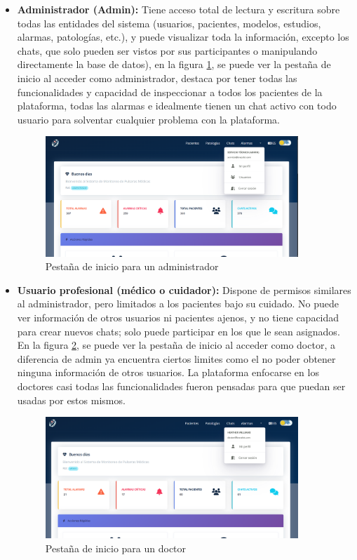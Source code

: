 \documentclass[12pt, a4paper]{article}
\begin{document}
\begin{itemize}
	\item \textbf{Administrador (Admin):}  
	Tiene acceso total de lectura y escritura sobre todas las entidades del sistema (usuarios, pacientes, modelos, estudios, alarmas, patologías, etc.), y puede visualizar toda la información, excepto los chats, que solo pueden ser vistos por sus participantes o manipulando directamente la base de datos), en la figura \ref{fig:admin}, se puede ver la pestaña de inicio al acceder como administrador, destaca por tener todas las funcionalidades y capacidad de inspeccionar a todos los pacientes de la plataforma, todas las alarmas e idealmente tienen un chat activo con todo usuario para solventar cualquier problema con la plataforma.
	
	
	\begin{figure}[htbp]
		\centering
		\includegraphics[width=0.9\textwidth]{images/pov_admin.png}
		\caption[Ejemplo]{Pestaña de inicio para un administrador}
		\label{fig:admin}
	\end{figure}
	
	
	\item \textbf{Usuario profesional (médico o cuidador):}  
	Dispone de permisos similares al administrador, pero limitados a los pacientes bajo su cuidado. No puede ver información de otros usuarios ni pacientes ajenos, y no tiene capacidad para crear nuevos chats; solo puede participar en los que le sean asignados. En la figura \ref{fig:doctor}, se puede ver la pestaña de inicio al acceder como doctor, a diferencia de admin ya encuentra ciertos limites como el no poder obtener ninguna información de otros usuarios. La plataforma enfocarse en los doctores casi todas las funcionalidades fueron pensadas para que puedan ser usadas por estos mismos.
	
	
	\begin{figure}[htbp]
		\centering
		\includegraphics[width=0.9\textwidth]{images/pov_doctor.png}
		\caption[Ejemplo]{Pestaña de inicio para un doctor}
		\label{fig:doctor}
	\end{figure}
	

\end{itemize}
\end{document}
